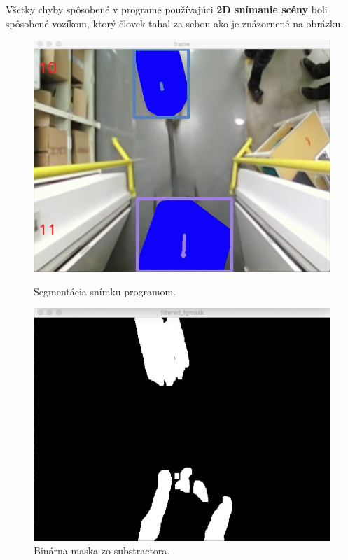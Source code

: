 Všetky chyby spôsobené v programe používajúci \textbf{2D snímanie scény} boli spôsobené vozíkom, ktorý človek ťahal za sebou ako je znázornené na obrázku. 

\begin{figure}[H]
  \centering
  \begin{minipage}[b]{0.48\textwidth}
    \includegraphics[width=\textwidth]{images/handCard}
    \caption{Segmentácia snímku programom.}
  \end{minipage}
  \hfill
  \begin{minipage}[b]{0.48\textwidth}
    \includegraphics[width=\textwidth]{images/handCard_fmask}
    \caption{Binárna maska zo substractora.}
  \end{minipage}
\end{figure}  

